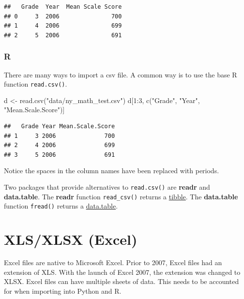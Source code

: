 \documentclass[
]{book}
\newenvironment{Shaded}{\begin{snugshade}}{\end{snugshade}}
\newcommand{\DecValTok}[1]{\textcolor[rgb]{0.00,0.00,0.81}{#1}}
\newcommand{\FunctionTok}[1]{\textcolor[rgb]{0.00,0.00,0.00}{#1}}
\newcommand{\NormalTok}[1]{#1}
\newcommand{\OtherTok}[1]{\textcolor[rgb]{0.56,0.35,0.01}{#1}}
\newcommand{\SpecialCharTok}[1]{\textcolor[rgb]{0.00,0.00,0.00}{#1}}
\newcommand{\StringTok}[1]{\textcolor[rgb]{0.31,0.60,0.02}{#1}}
\begin{document}
\begin{verbatim}
##   Grade  Year  Mean Scale Score
## 0     3  2006               700
## 1     4  2006               699
## 2     5  2006               691
\end{verbatim}

\hypertarget{r-12}{%
\subsubsection*{R}\label{r-12}}

There are many ways to import a csv file. A common way is to use the base R function \texttt{read.csv()}.

\begin{Shaded}
\begin{Highlighting}[]
\NormalTok{d }\OtherTok{\textless{}{-}} \FunctionTok{read.csv}\NormalTok{(}\StringTok{"data/ny\_math\_test.csv"}\NormalTok{)}
\NormalTok{d[}\DecValTok{1}\SpecialCharTok{:}\DecValTok{3}\NormalTok{, }\FunctionTok{c}\NormalTok{(}\StringTok{"Grade"}\NormalTok{, }\StringTok{"Year"}\NormalTok{, }\StringTok{"Mean.Scale.Score"}\NormalTok{)]}
\end{Highlighting}
\end{Shaded}

\begin{verbatim}
##   Grade Year Mean.Scale.Score
## 1     3 2006              700
## 2     4 2006              699
## 3     5 2006              691
\end{verbatim}

Notice the spaces in the column names have been replaced with periods.

Two packages that provide alternatives to \texttt{read.csv()} are \textbf{readr} and \textbf{data.table}. The \textbf{readr} function \texttt{read\_csv()} returns a \href{https://r4ds.had.co.nz/tibbles.html}{tibble}. The \textbf{data.table} function \texttt{fread()} returns a \href{https://rdatatable.gitlab.io/data.table/articles/datatable-intro.html}{data.table}.

\hypertarget{xlsxlsx-excel}{%
\section{XLS/XLSX (Excel)}\label{xlsxlsx-excel}}

Excel files are native to Microsoft Excel. Prior to 2007, Excel files had an extension of XLS. With the launch of Excel 2007, the extension was changed to XLSX. Excel files can have multiple sheets of data. This needs to be accounted for when importing into Python and R.
\end{document}
